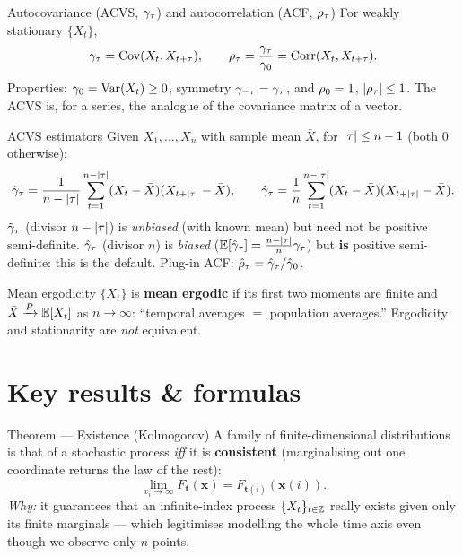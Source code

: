 \documentclass[11pt]{article}
\begin{document}
\begin{defn}{Autocovariance (ACVS, $\gamma_\tau$) and autocorrelation (ACF, $\rho_\tau$)}
For weakly stationary $\{X_t\}$,
\[
\gamma_\tau=\operatorname{Cov}(X_t,X_{t+\tau}),\qquad \rho_\tau=\frac{\gamma_\tau}{\gamma_0}=\operatorname{Corr}(X_t,X_{t+\tau}).
\]
Properties: $\gamma_0=\operatorname{Var}(X_t)\ge 0$, symmetry $\gamma_{-\tau}=\gamma_\tau$, and $\rho_0=1$, $\left\lvert \rho_\tau \right\rvert\le 1$. The ACVS is, for a series, the analogue of the covariance matrix of a vector.
\end{defn}

\begin{defn}{ACVS estimators}
Given $X_1,\dots,X_n$ with sample mean $\bar X$, for $\left\lvert \tau \right\rvert\le n-1$ (both $0$ otherwise):
\[
\tilde{\gamma}_\tau=\frac{1}{n-\left\lvert \tau \right\rvert}\sum_{t=1}^{n-\left\lvert \tau \right\rvert}(X_t-\bar X)(X_{t+\left\lvert \tau \right\rvert}-\bar X),
\qquad
\hat{\gamma}_\tau=\frac{1}{n}\sum_{t=1}^{n-\left\lvert \tau \right\rvert}(X_t-\bar X)(X_{t+\left\lvert \tau \right\rvert}-\bar X).
\]
$\tilde{\gamma}_\tau$ (divisor $n-\left\lvert \tau \right\rvert$) is \emph{unbiased} (with known mean) but need not be positive semi-definite. $\hat{\gamma}_\tau$ (divisor $n$) is \emph{biased} ($\mathbb{E}[\hat{\gamma}_\tau]=\tfrac{n-\left\lvert \tau \right\rvert}{n}\gamma_\tau$) but \textbf{is} positive semi-definite: this is the default. Plug-in ACF: $\hat{\rho}_\tau=\hat{\gamma}_\tau/\hat{\gamma}_0$.
\end{defn}

\begin{defn}{Mean ergodicity}
$\{X_t\}$ is \textbf{mean ergodic} if its first two moments are finite and $\bar X\xrightarrow{P} \mathbb{E}[X_t]$ as $n\to\infty$: ``temporal averages $=$ population averages.'' Ergodicity and stationarity are \emph{not} equivalent.
\end{defn}

\section*{Key results \& formulas}

\begin{result}{Theorem --- Existence (Kolmogorov)}
A family of finite-dimensional distributions is that of a stochastic process \emph{iff} it is \textbf{consistent} (marginalising out one coordinate returns the law of the rest):
\[
\lim_{x_i\to\infty}F_{\mathbf t}(\mathbf x)=F_{\mathbf t(i)}(\mathbf x(i)).
\]
\textit{Why:} it guarantees that an infinite-index process $\{X_t\}_{t\in\mathbb{Z}}$ really exists given only its finite marginals --- which legitimises modelling the whole time axis even though we observe only $n$ points.
\end{result}
\end{document}
